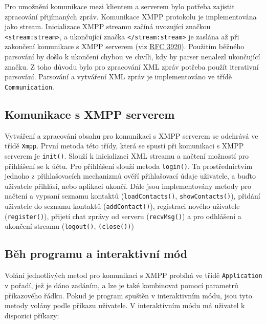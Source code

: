 \documentclass[11pt,a4paper]{article}
\begin{document}
      Pro umožnění komunikace mezi klientem a serverem bylo potřeba zajistit
      zpracování přijímaných zpráv. Komunikace XMPP protokolu je
      implementována jako stream. Inicializace XMPP streamu začíná uvozující
      značkou \texttt{<stream:stream>}, a ukončující značka
      \texttt{</stream:stream>} je zaslána až při zakončení komunikace s
      XMPP serverem
      (viz \href{http://xmpp.org/rfcs/rfc3920.html#streams}{RFC 3920}).
      Použitím běžného parsování by došlo k ukončení chybou ve chvíli, kdy by
      parser nenalezl ukončující značku. Z toho důvodu bylo pro zpracování XML
      zpráv potřeba použít iterativní parsování. Parsování a vytváření XML
      zpráv je implementováno ve třídě \texttt{Communication}.

    \subsection{Komunikace s XMPP serverem}

      Vytváření a zpracování obsahu pro komunikaci s XMPP serverem se odehrává
      ve třídě \texttt{Xmpp}.
      První metoda této třídy, která se spustí při komunikaci
      s XMPP serverem je \texttt{init()}. Slouží k inicializaci XML streamu
      a načtení možností pro přihlášení se k účtu. Pro přihlášení slouží
      metoda \texttt{login()}. Ta prostřednictvím jednoho z přihlašovacích
      mechanizmů ověří přihlašovací údaje uživatele,
      a buďto uživatele přihlásí, nebo aplikaci ukončí.
      Dále jsou implementovány metody pro načtení a vypsaní seznamu kontaktů
      (\texttt{loadContacts()}, \texttt{showContacts()}), přidání uživatele do
      seznamu kontaktů (\texttt{addContact()}), registraci nového uživatele
      (\texttt{register()}), přijetí chat zprávy od serveru
      (\texttt{recvMsg()}) a pro odhlášení a ukončení streamu
      (\texttt{logout()}, \texttt{(close())})

    \subsection{Běh programu a interaktivní mód}

      Volání jednotlivých metod pro komunikaci s XMPP probíhá ve třídě
      \texttt{Application} v pořadí, jež je dáno zadáním, a lze je také
      kombinovat pomocí parametrů příkazového řádku. Pokud je program spuštěn
      v interaktivním módu, jsou tyto metody volány podle příkazu uživatele.
      V interaktivním módu má uživatel k dispozici příkazy:
\end{document}
